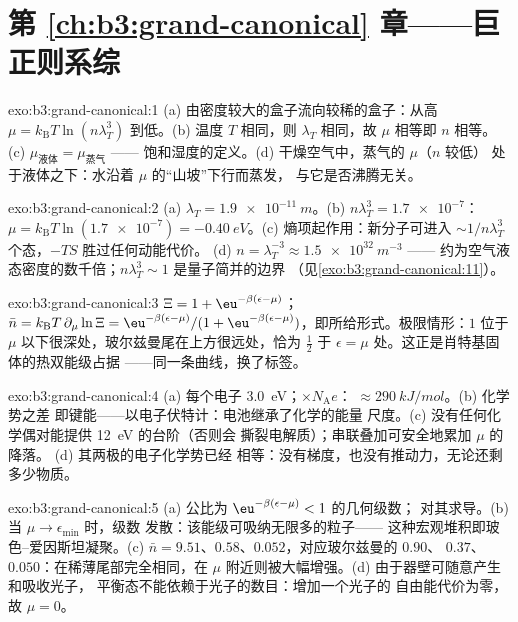 \section*{第 \ref{ch:b3:grand-canonical} 章——巨正则系综}

\begin{solution}{exo:b3:grand-canonical:1}
(a) 由密度较大的盒子流向较稀的盒子：从高 $\mu =
k_{\text{B}}T\ln(n\lambda_T^3)$ 到低。(b) 温度 $T$ 相同，则
$\lambda_T$ 相同，故 $\mu$ 相等即 $n$ 相等。(c)
$\mu_{\text{液体}} = \mu_{\text{蒸气}}$ ——
饱和湿度的定义。(d) 干燥空气中，蒸气的 $\mu$（$n$ 较低）
处于液体之下：水沿着 $\mu$ 的“山坡”下行而蒸发，
与它是否沸腾无关。
\end{solution}

\begin{solution}{exo:b3:grand-canonical:2}
(a) $\lambda_T = \qty{1.9e-11}{m}$。(b) $n\lambda_T^3 =
\num{1.7e-7}$：$\mu = k_{\text{B}}T\ln(\num{1.7e-7}) =
\qty{-0.40}{eV}$。(c) 熵项起作用：新分子可进入
$\sim1/n\lambda_T^3$ 个态，$-TS$ 胜过任何动能代价。
(d) $n = \lambda_T^{-3} \approx \qty{1.5e32}{m^{-3}}$ ——
约为空气液态密度的数千倍；$n\lambda_T^3 \sim 1$
是量子简并的边界
（见\cref{exo:b3:grand-canonical:11}）。
\end{solution}

\begin{solution}{exo:b3:grand-canonical:3}
$\Xi = 1 + \eu^{-\beta(\epsilon-\mu)}$；$\bar n = k_{\text{B}}T\,
\partial_\mu\ln\Xi = \eu^{-\beta(\epsilon-\mu)}/(1 +
\eu^{-\beta(\epsilon-\mu)})$，即所给形式。极限情形：$1$ 位于
$\mu$ 以下很深处，玻尔兹曼尾在上方很远处，恰为 $\tfrac12$
于 $\epsilon = \mu$ 处。这正是肖特基固体的热双能级占据
——同一条曲线，换了标签。
\end{solution}

\begin{solution}{exo:b3:grand-canonical:4}
(a) 每个电子 \qty{3.0}{eV}；$\times N_{\text{A}}e$：
$\approx\qty{290}{kJ/mol}$。(b) 化学势之差
即键能——以电子伏特计：电池继承了化学的能量
尺度。(c) 没有任何化学偶对能提供 \qty{12}{eV} 的台阶（否则会
撕裂电解质）；串联叠加可安全地累加 $\mu$ 的降落。
(d) 其两极的电子化学势已经
相等：没有梯度，也没有推动力，无论还剩多少物质。
\end{solution}

\begin{solution}{exo:b3:grand-canonical:5}
(a) 公比为 $\eu^{-\beta(\epsilon-\mu)} < 1$ 的几何级数；
对其求导。(b) 当 $\mu \to \epsilon_{\min}$ 时，级数
发散：该能级可吸纳无限多的粒子——
这种宏观堆积即玻色–爱因斯坦凝聚。(c)
$\bar n = 9.51$、$0.58$、$0.052$，对应玻尔兹曼的 $0.90$、
$0.37$、$0.050$：在稀薄尾部完全相同，在
$\mu$ 附近则被大幅增强。(d) 由于器壁可随意产生和吸收光子，
平衡态不能依赖于光子的数目：增加一个光子的
自由能代价为零，故 $\mu = 0$。
\end{solution}


